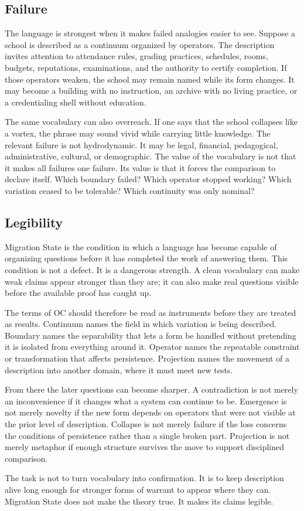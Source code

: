 \documentclass[11pt,a4paper,openany]{book}
\begin{document}
\subsection{Failure}
The language is strongest when it makes failed analogies easier to see. Suppose a school is described as a continuum organized by operators. The description invites attention to attendance rules, grading practices, schedules, rooms, budgets, reputations, examinations, and the authority to certify completion. If those operators weaken, the school may remain named while its form changes. It may become a building with no instruction, an archive with no living practice, or a credentialing shell without education. \cite{landau_stat_physics,prigogine_dissipative}\par
The same vocabulary can also overreach. If one says that the school collapses like a vortex, the phrase may sound vivid while carrying little knowledge. The relevant failure is not hydrodynamic. It may be legal, financial, pedagogical, administrative, cultural, or demographic. The value of the vocabulary is not that it makes all failures one failure. Its value is that it forces the comparison to declare itself. Which boundary failed? Which operator stopped working? Which variation ceased to be tolerable? Which continuity was only nominal?\par
\subsection{Legibility}
Migration State is the condition in which a language has become capable of organizing questions before it has completed the work of answering them. This condition is not a defect. It is a dangerous strength. A clean vocabulary can make weak claims appear stronger than they are; it can also make real questions visible before the available proof has caught up. \cite{landau_stat_physics,prigogine_dissipative}\par
The terms of OC should therefore be read as instruments before they are treated as results. Continuum names the field in which variation is being described. Boundary names the separability that lets a form be handled without pretending it is isolated from everything around it. Operator names the repeatable constraint or transformation that affects persistence. Projection names the movement of a description into another domain, where it must meet new tests.\par
From there the later questions can become sharper. A contradiction is not merely an inconvenience if it changes what a system can continue to be. Emergence is not merely novelty if the new form depends on operators that were not visible at the prior level of description. Collapse is not merely failure if the loss concerns the conditions of persistence rather than a single broken part. Projection is not merely metaphor if enough structure survives the move to support disciplined comparison.\par
The task is not to turn vocabulary into confirmation. It is to keep description alive long enough for stronger forms of warrant to appear where they can. Migration State does not make the theory true. It makes its claims legible.\par
\end{document}
